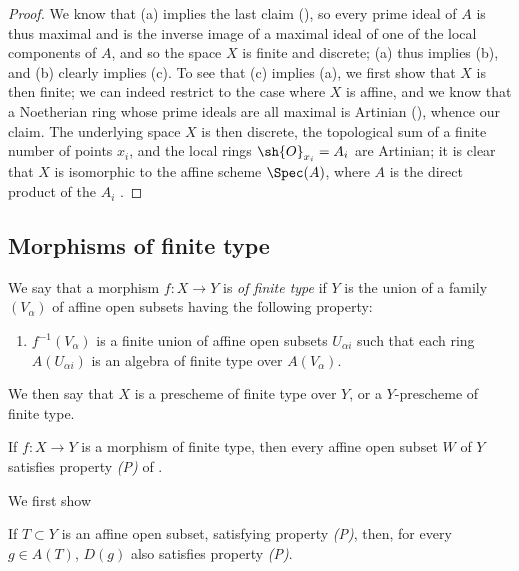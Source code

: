 \begin{proof}
We know that (a) implies the last claim (\cite[p.~205, th.~3]{I-13}), so every prime ideal of $A$ is thus maximal and is the inverse image of a maximal ideal of one of the local components of $A$, and so the space $X$ is finite and discrete;
(a) thus implies (b), and (b) clearly implies (c).
To see that (c) implies (a), we first show that $X$ is then finite;
we can indeed restrict to the case where $X$ is affine, and we know that a Noetherian ring whose prime ideals are all maximal is Artinian (\cite[p.~203]{I-13}), whence our claim.
The underlying space $X$ is then discrete, the topological sum of a finite number of points $x_i$, and the local rings $\sh{O}_{x_i}=A_i$ are Artinian;
it is clear that $X$ is isomorphic to the affine scheme $\Spec(A)$, where $A$ is the direct product of the $A_i$ .
\end{proof}

\subsection{Morphisms of finite type}
\label{subsection:I.6.3}

\begin{definition}[6.3.1]
\label{I.6.3.1}
We say that a morphism $f:X\to Y$ is \emph{of finite type} if $Y$ is the union of a family $(V_\alpha)$ of affine open subsets having the following property:
\begin{enumerate}
  \item[(P)] $f^{-1}(V_\alpha)$ is a finite union of affine open subsets $U_{\alpha i}$ such that each ring $A(U_{\alpha i})$ is an algebra of finite type over $A(V_\alpha)$.
\end{enumerate}
We then say that $X$ is a prescheme of finite type over $Y$, or a $Y$-prescheme of finite type.
\end{definition}

\begin{proposition}[6.3.2]
\label{I.6.3.2}
If $f:X\to Y$ is a morphism of finite type, then every affine open subset $W$ of $Y$ satisfies property \emph{(P)} of .
\end{proposition}

We first show
\begin{lemma}[6.3.2.1]
\label{I.6.3.2.1}
If $T\subset Y$ is an affine open subset, satisfying property \emph{(P)}, then, for every $g\in A(T)$, $D(g)$ also satisfies property \emph{(P)}.
\end{lemma}

